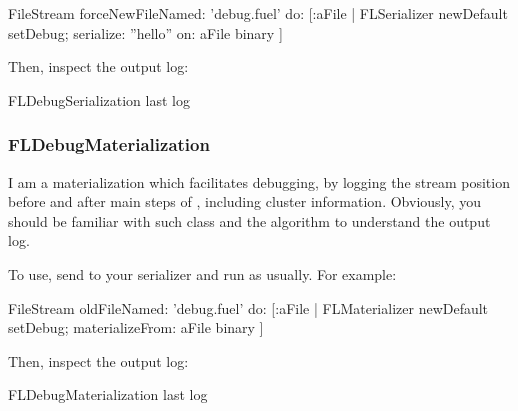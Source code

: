 \documentclass[a4paper,10pt,twoside]{book}
\begin{document}
\begin{code}{}
FileStream forceNewFileNamed: 'debug.fuel' do: [:aFile |
    FLSerializer newDefault
        setDebug;
        serialize: ''hello'' on: aFile binary ]
\end{code}

Then, inspect the output log:


\begin{code}{}
FLDebugSerialization last log
\end{code}


\subsubsection{FLDebugMaterialization}

I am a materialization which facilitates debugging, by logging the stream position before and after main steps of , including cluster information. Obviously, you should be familiar with such class and the algorithm to understand the output log.

To use, send  to your serializer and run as usually. For example:


\begin{code}{}
FileStream oldFileNamed: 'debug.fuel' do: [:aFile |
    FLMaterializer newDefault
        setDebug;
        materializeFrom: aFile binary ]
\end{code}

Then, inspect the output log:

\begin{code}{}
FLDebugMaterialization last log
\end{code}


\ifx\wholebook\relax\else
   
   
\end{document}
